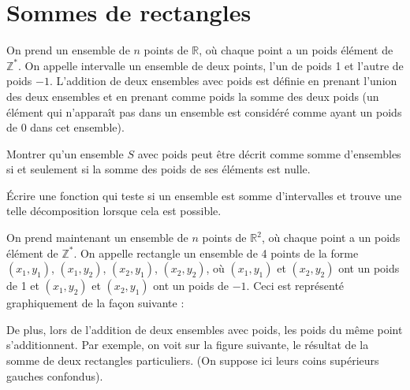 \renewcommand{\SourceFile}{6-geometrie-et-images/src/6-3.ml}

\section{Sommes de rectangles}

On prend un ensemble de $n$ points de $\mathbb{R}$, où chaque point a un poids élément de $\mathbb{Z}^*$. On appelle intervalle un ensemble de deux points, l'un de poids 1 et l'autre de poids $-1$. L'addition de deux ensembles avec poids est définie en prenant l'union des deux ensembles et en prenant comme poids la somme des deux poids (un élément qui n'apparaît pas dans un ensemble est considéré comme ayant un poids de 0 dans cet ensemble).

\Q
Montrer qu'un ensemble $S$ avec poids peut être décrit comme somme d'ensembles si et seulement si la somme des poids de ses éléments est nulle.

\Q
Écrire une fonction qui teste si un ensemble est somme d'intervalles et trouve une telle décomposition lorsque cela est possible.
\bigskip

On prend maintenant un ensemble de $n$ points de $\mathbb{R}^2$, où chaque point a un poids élément de $\mathbb{Z}^*$. On appelle rectangle un ensemble de 4 points de la forme $(x_1,y_1)$, $(x_1,y_2)$, $(x_2,y_1)$, $(x_2,y_2)$, où $(x_1,y_1)$ et $(x_2,y_2)$ ont un poids de 1 et $(x_1,y_2)$ et $(x_2,y_1)$ ont un poids de $-1$. Ceci est représenté graphiquement de la façon suivante :

\begin{center}
\end{center}

De plus, lors de l'addition de deux ensembles avec poids, les poids du même point s'additionnent. Par exemple, on voit sur la figure suivante, le résultat de la somme de deux rectangles particuliers. (On suppose ici leurs coins supérieurs gauches confondus).

